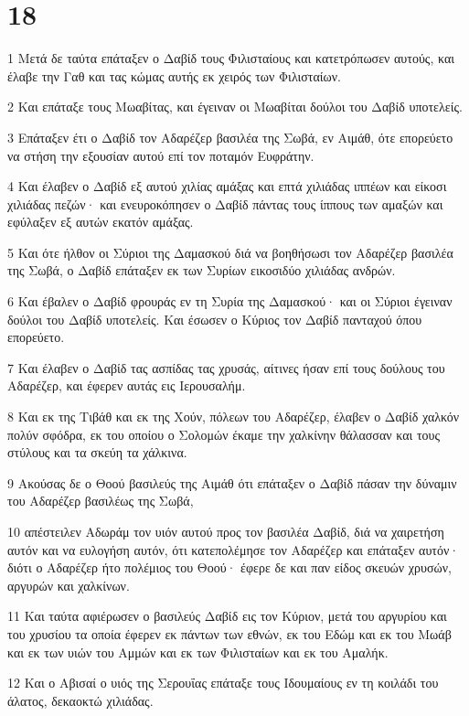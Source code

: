 \chapter{18}

\par 1 Μετά δε ταύτα επάταξεν ο Δαβίδ τους Φιλισταίους και κατετρόπωσεν αυτούς, και έλαβε την Γαθ και τας κώμας αυτής εκ χειρός των Φιλισταίων.
\par 2 Και επάταξε τους Μωαβίτας, και έγειναν οι Μωαβίται δούλοι του Δαβίδ υποτελείς.
\par 3 Επάταξεν έτι ο Δαβίδ τον Αδαρέζερ βασιλέα της Σωβά, εν Αιμάθ, ότε επορεύετο να στήση την εξουσίαν αυτού επί τον ποταμόν Ευφράτην.
\par 4 Και έλαβεν ο Δαβίδ εξ αυτού χιλίας αμάξας και επτά χιλιάδας ιππέων και είκοσι χιλιάδας πεζών· και ενευροκόπησεν ο Δαβίδ πάντας τους ίππους των αμαξών και εφύλαξεν εξ αυτών εκατόν αμάξας.
\par 5 Και ότε ήλθον οι Σύριοι της Δαμασκού διά να βοηθήσωσι τον Αδαρέζερ βασιλέα της Σωβά, ο Δαβίδ επάταξεν εκ των Συρίων εικοσιδύο χιλιάδας ανδρών.
\par 6 Και έβαλεν ο Δαβίδ φρουράς εν τη Συρία της Δαμασκού· και οι Σύριοι έγειναν δούλοι του Δαβίδ υποτελείς. Και έσωσεν ο Κύριος τον Δαβίδ πανταχού όπου επορεύετο.
\par 7 Και έλαβεν ο Δαβίδ τας ασπίδας τας χρυσάς, αίτινες ήσαν επί τους δούλους του Αδαρέζερ, και έφερεν αυτάς εις Ιερουσαλήμ.
\par 8 Και εκ της Τιβάθ και εκ της Χούν, πόλεων του Αδαρέζερ, έλαβεν ο Δαβίδ χαλκόν πολύν σφόδρα, εκ του οποίου ο Σολομών έκαμε την χαλκίνην θάλασσαν και τους στύλους και τα σκεύη τα χάλκινα.
\par 9 Ακούσας δε ο Θοού βασιλεύς της Αιμάθ ότι επάταξεν ο Δαβίδ πάσαν την δύναμιν του Αδαρέζερ βασιλέως της Σωβά,
\par 10 απέστειλεν Αδωράμ τον υιόν αυτού προς τον βασιλέα Δαβίδ, διά να χαιρετήση αυτόν και να ευλογήση αυτόν, ότι κατεπολέμησε τον Αδαρέζερ και επάταξεν αυτόν· διότι ο Αδαρέζερ ήτο πολέμιος του Θοού· έφερε δε και παν είδος σκευών χρυσών, αργυρών και χαλκίνων.
\par 11 Και ταύτα αφιέρωσεν ο βασιλεύς Δαβίδ εις τον Κύριον, μετά του αργυρίου και του χρυσίου τα οποία έφερεν εκ πάντων των εθνών, εκ του Εδώμ και εκ του Μωάβ και εκ των υιών του Αμμών και εκ των Φιλισταίων και εκ του Αμαλήκ.
\par 12 Και ο Αβισαί ο υιός της Σερουΐας επάταξε τους Ιδουμαίους εν τη κοιλάδι του άλατος, δεκαοκτώ χιλιάδας.
